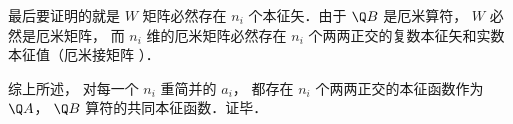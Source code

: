 最后要证明的就是 $W$ 矩阵必然存在 $n_i$ 个本征矢．由于 $\Q B$ 是厄米算符，  $W$ 必然是厄米矩阵， 而 $n_i$ 维的厄米矩阵必然存在 $n_i$ 个两两正交的复数本征矢和实数本征值（厄米接矩阵%
）．

综上所述， 对每一个 $n_i$ 重简并的 $a_i$，  都存在 $n_i$ 个两两正交的本征函数作为 $\Q A$，  $\Q B$ 算符的共同本征函数．证毕．
